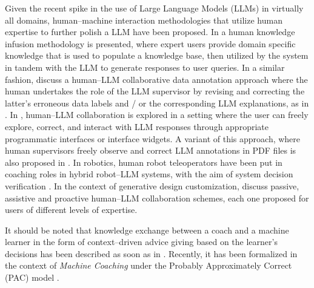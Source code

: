 \documentclass[a4paper,twoside]{article}
\begin{document}
Given the recent spike in the use of Large Language Models (LLMs) in virtually all domains, human--machine interaction methodologies that utilize human expertise to further polish a LLM have been proposed. In \cite{welz2024} a human knowledge infusion methodology is presented, where expert users provide domain specific knowledge that is used to populate a knowledge base, then utilized by the system in tandem with the LLM to generate responses to user queries. In a similar fashion, \cite{wang2024} discuss a human--LLM collaborative data annotation approach where the human undertakes the role of the LLM supervisor by revising and correcting the latter's erroneous data labels and / or the corresponding LLM explanations, as in \cite{tesoKerstingIML2019}. In \cite{kim2024megannohumanllmcollaborativeannotation}, human--LLM collaboration is explored in a setting where the user can freely explore, correct, and interact with LLM responses through appropriate programmatic interfaces or interface widgets. A variant of this approach, where human supervisors freely observe and correct LLM annotations in PDF files is also proposed in \cite{tang2024}. In robotics, human robot teleoperators have been put in coaching roles in hybrid robot--LLM systems, with the aim of system decision verification \cite{liu2023llmbasedhumanrobotcollaborationframework}. In the context of generative design customization, \cite{WANG2025425} discuss passive, assistive and proactive human--LLM collaboration schemes, each one proposed for users of different levels of expertise.

It should be noted that knowledge exchange between a coach and a machine learner in the form of context--driven advice giving based on the learner's decisions has been described as soon as in \cite{mccarthyProgramsCommonSense1959}. Recently, it has been formalized in the context of \emph{Machine Coaching} \cite{michaelAdviceTaker2017,michaelMachineCoaching2019} under the Probably Approximately Correct (PAC) model \cite{valiantPAC1984}.
%
%
%
\end{document}
